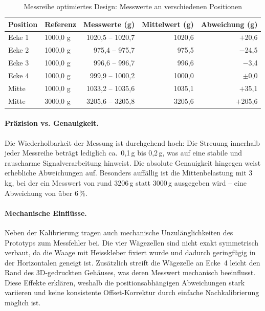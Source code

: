 \documentclass[12pt,a4paper]{article}
\begin{document}
	\begin{table}[h]
		\centering
		\begin{tabular}{llrrr}
			\toprule
			\textbf{Position} & \textbf{Referenz} & \textbf{Messwerte (g)} & \textbf{Mittelwert (g)} & \textbf{Abweichung (g)} \\
			\midrule
			Ecke 1  & 1000{,}0 g & 1020{,}5 -- 1020{,}7 & 1020{,}6 & $+$20{,}6 \\
			Ecke 2  & 1000{,}0 g & 975{,}4 -- 975{,}7  & 975{,}5  & $-$24{,}5 \\
			Ecke 3  & 1000{,}0 g & 996{,}6 -- 996{,}7  & 996{,}6  & $-$3{,}4  \\
			Ecke 4  & 1000{,}0 g & 999{,}9 -- 1000{,}2 & 1000{,}0 & $\pm$0{,}0 \\
			Mitte   & 1000{,}0 g & 1033{,}2 -- 1035{,}6 & 1035{,}1 & $+$35{,}1 \\
			Mitte   & 3000{,}0 g & 3205{,}6 -- 3205{,}8 & 3205{,}6 & $+$205{,}6 \\
			\bottomrule
		\end{tabular}
		\caption{Messreihe optimiertes Design: Messwerte an verschiedenen Positionen}
		\label{tab:messreihe}
	\end{table}

	\paragraph{Präzision vs. Genauigkeit.}
	Die Wiederholbarkeit der Messung ist durchgehend hoch: Die Streuung innerhalb jeder Messreihe beträgt lediglich ca.\ 0{,}1\,g bis 0{,}2\,g, was auf eine stabile und rauscharme Signalverarbeitung hinweist.
	Die absolute Genauigkeit hingegen weist erhebliche Abweichungen auf.
	Besonders auffällig ist die Mittenbelastung mit 3\,kg, bei der ein Messwert von rund 3206\,g statt 3000\,g ausgegeben wird -- eine Abweichung von über 6\,\%.

	\paragraph{Mechanische Einflüsse.}
	Neben der Kalibrierung tragen auch mechanische Unzulänglichkeiten des Prototyps zum Messfehler bei.
	Die vier Wägezellen sind nicht exakt symmetrisch verbaut, da die Waage mit Heisskleber fixiert wurde und dadurch geringfügig in der Horizontalen geneigt ist.
	Zusätzlich streift die Wägezelle an Ecke~4 leicht den Rand des 3D-gedruckten Gehäuses, was deren Messwert mechanisch beeinflusst.
	Diese Effekte erklären, weshalb die positionsabhängigen Abweichungen stark variieren und keine konsistente Offset-Korrektur durch einfache Nachkalibrierung möglich ist.
\end{document}
